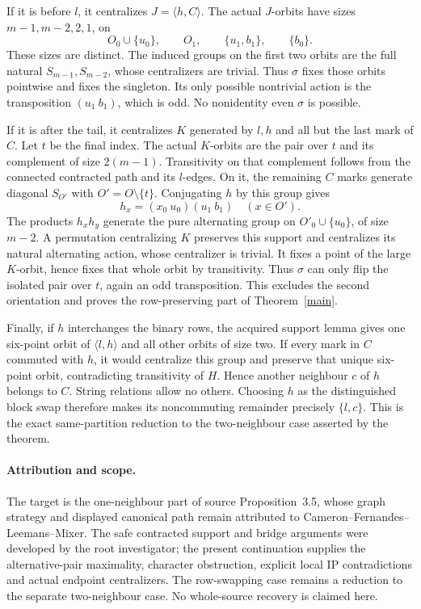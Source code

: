 \documentclass[11pt,a4paper]{article}
\newcommand{\gen}[1]{\langle#1\rangle}
\begin{document}
If it is before $l$, it centralizes $J=\gen{h,C}$. The actual
$J$-orbits have sizes $m-1,m-2,2,1$, on
\[
 O_0\cup\{u_0\},\qquad O_1,\qquad
                \{u_1,b_1\},\qquad\{b_0\}.
\]
These sizes are distinct. The induced groups on the first two
orbits are the full natural $S_{m-1},S_{m-2}$, whose centralizers
are trivial. Thus $\sigma$ fixes those orbits pointwise and fixes
the singleton. Its only possible nontrivial action is the
transposition $(u_1\ b_1)$, which is odd. No nonidentity even
$\sigma$ is possible.

If it is after the tail, it centralizes $K$ generated by $l,h$
and all but the last mark of $C$. Let $t$ be the final index.
The actual $K$-orbits are the pair over $t$ and its complement
of size $2(m-1)$. Transitivity on that complement follows from
the connected contracted path and its $l$-edges. On it, the
remaining $C$ marks generate diagonal $S_{O'}$ with
$O'=O\setminus\{t\}$. Conjugating $h$ by this group gives
\[
                    h_x=(x_0\ u_0)(u_1\ b_1)
                         \quad(x\in O').
\]
The products $h_xh_y$ generate the pure alternating group on
$O'_0\cup\{u_0\}$, of size $m-2$. A permutation centralizing
$K$ preserves this support and centralizes its natural alternating
action, whose centralizer is trivial. It fixes a point of the
large $K$-orbit, hence fixes that whole orbit by transitivity.
Thus $\sigma$ can only flip the isolated pair over $t$, again
an odd transposition. This excludes the second orientation and
proves the row-preserving part of Theorem~\ref{main}.

Finally, if $h$ interchanges the binary rows, the acquired support
lemma gives one six-point orbit of $\gen{l,h}$ and all other
orbits of size two. If every mark in $C$ commuted with $h$, it
would centralize this group and preserve that unique six-point
orbit, contradicting transitivity of $H$. Hence another neighbour
$c$ of $h$ belongs to $C$. String relations allow no others.
Choosing $h$ as the distinguished block swap therefore makes its
noncommuting remainder precisely $\{l,c\}$. This is the exact
same-partition reduction to the two-neighbour case asserted by
the theorem.

\paragraph{Attribution and scope.}
The target is the one-neighbour part of source Proposition~3.5,
whose graph strategy and displayed canonical path remain attributed
to Cameron--Fernandes--Leemans--Mixer. The safe contracted support
and bridge arguments were developed by the root investigator;
the present continuation supplies the alternative-pair maximality,
character obstruction, explicit local IP contradictions and actual
endpoint centralizers. The row-swapping case remains a reduction
to the separate two-neighbour case. No whole-source recovery is
claimed here.
\end{document}

